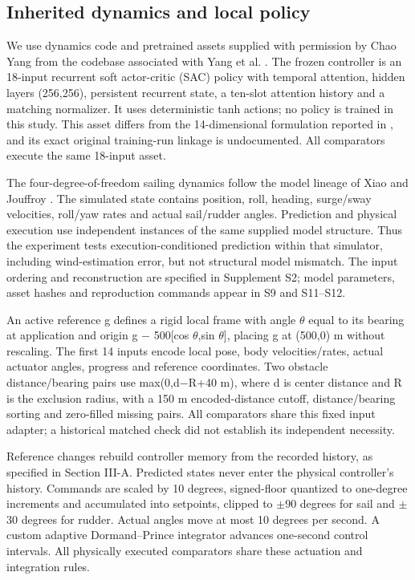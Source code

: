 \documentclass[conference]{IEEEtran}
\begin{document}
\subsection{Inherited dynamics and local policy}

We use dynamics code and pretrained assets supplied with permission by Chao Yang from the codebase associated with Yang et al. \cite{ref8}. The frozen controller is an 18-input recurrent soft actor-critic (SAC) policy \cite{ref9} with temporal attention, hidden layers (256,256), persistent recurrent state, a ten-slot attention history and a matching normalizer. It uses deterministic tanh actions; no policy is trained in this study. This asset differs from the 14-dimensional formulation reported in \cite{ref8}, and its exact original training-run linkage is undocumented. All comparators execute the same 18-input asset.

The four-degree-of-freedom sailing dynamics follow the model lineage of Xiao and Jouffroy \cite{ref10}. The simulated state contains position, roll, heading, surge/sway velocities, roll/yaw rates and actual sail/rudder angles. Prediction and physical execution use independent instances of the same supplied model structure. Thus the experiment tests execution-conditioned prediction within that simulator, including wind-estimation error, but not structural model mismatch. The input ordering and reconstruction are specified in Supplement S2; model parameters, asset hashes and reproduction commands appear in S9 and S11--S12.

An active reference g defines a rigid local frame with angle \ensuremath{\theta} equal to its bearing at application and origin g \ensuremath{-} 500[cos \ensuremath{\theta},sin \ensuremath{\theta}], placing g at (500,0) m without rescaling. The first 14 inputs encode local pose, body velocities/rates, actual actuator angles, progress and reference coordinates. Two obstacle distance/bearing pairs use max(0,d\ensuremath{-}R+40 m), where d is center distance and R is the exclusion radius, with a 150 m encoded-distance cutoff, distance/bearing sorting and zero-filled missing pairs. All comparators share this fixed input adapter; a historical matched check did not establish its independent necessity.

Reference changes rebuild controller memory from the recorded history, as specified in Section III-A. Predicted states never enter the physical controller's history. Commands are scaled by 10 degrees, signed-floor quantized to one-degree increments and accumulated into setpoints, clipped to \ensuremath{\pm}90 degrees for sail and \ensuremath{\pm}30 degrees for rudder. Actual angles move at most 10 degrees per second. A custom adaptive Dormand--Prince integrator advances one-second control intervals. All physically executed comparators share these actuation and integration rules.
\end{document}
